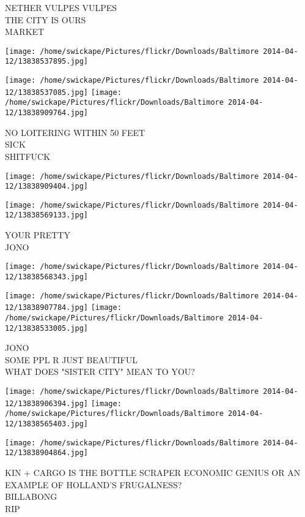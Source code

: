 \documentclass[10pt,letterpaper]{article}
\begin{document}
NETHER VULPES VULPES\\
THE CITY IS OURS\\
MARKET
\pagebreak

\texttt{[image: /home/swickape/Pictures/flickr/Downloads/Baltimore 2014-04-12/13838537895.jpg]}

\vspace{0.25in}
\texttt{[image: /home/swickape/Pictures/flickr/Downloads/Baltimore 2014-04-12/13838537085.jpg]}
\texttt{[image: /home/swickape/Pictures/flickr/Downloads/Baltimore 2014-04-12/13838909764.jpg]}

NO LOITERING WITHIN 50 FEET\\
SICK\\
SHITFUCK
\pagebreak

\texttt{[image: /home/swickape/Pictures/flickr/Downloads/Baltimore 2014-04-12/13838909404.jpg]}

\vspace{0.25in}
\texttt{[image: /home/swickape/Pictures/flickr/Downloads/Baltimore 2014-04-12/13838569133.jpg]}

YOUR PRETTY\\
JONO
\pagebreak

\texttt{[image: /home/swickape/Pictures/flickr/Downloads/Baltimore 2014-04-12/13838568343.jpg]}

\vspace{0.25in}
\texttt{[image: /home/swickape/Pictures/flickr/Downloads/Baltimore 2014-04-12/13838907784.jpg]}
\texttt{[image: /home/swickape/Pictures/flickr/Downloads/Baltimore 2014-04-12/13838533005.jpg]}

JONO\\
SOME PPL R JUST BEAUTIFUL\\
WHAT DOES "SISTER CITY" MEAN TO YOU?
\pagebreak

\texttt{[image: /home/swickape/Pictures/flickr/Downloads/Baltimore 2014-04-12/13838906394.jpg]}
\texttt{[image: /home/swickape/Pictures/flickr/Downloads/Baltimore 2014-04-12/13838565403.jpg]}

\texttt{[image: /home/swickape/Pictures/flickr/Downloads/Baltimore 2014-04-12/13838904864.jpg]}

KIN + CARGO IS THE BOTTLE SCRAPER ECONOMIC GENIUS OR AN EXAMPLE OF HOLLAND'S FRUGALNESS?\\
BILLABONG\\
RIP
\pagebreak
\end{document}
